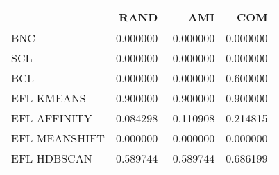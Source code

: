 \begin{tabular}{lrrr}
\toprule
 & RAND & AMI & COM \\
\midrule
BNC & 0.000000 & 0.000000 & 0.000000 \\
SCL & 0.000000 & 0.000000 & 0.000000 \\
BCL & 0.000000 & -0.000000 & 0.600000 \\
EFL-KMEANS & 0.900000 & 0.900000 & 0.900000 \\
EFL-AFFINITY & 0.084298 & 0.110908 & 0.214815 \\
EFL-MEANSHIFT & 0.000000 & 0.000000 & 0.000000 \\
EFL-HDBSCAN & 0.589744 & 0.589744 & 0.686199 \\
\bottomrule
\end{tabular}
